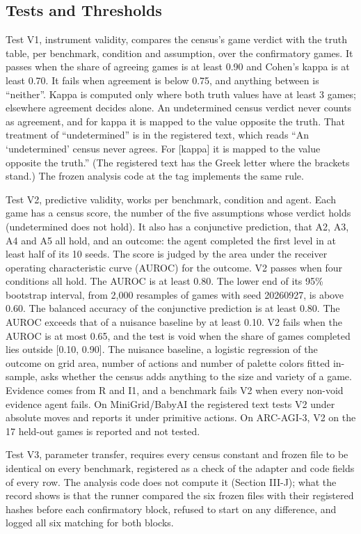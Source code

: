 \documentclass[journal]{IEEEtran}
\begin{document}
\subsection{Tests and Thresholds}\label{tests-and-thresholds}

Test V1, instrument validity, compares the census's game verdict with
the truth table, per benchmark, condition and assumption, over the
confirmatory games. It passes when the share of agreeing games is at
least 0.90 and Cohen's kappa is at least 0.70. It fails when agreement
is below 0.75, and anything between is ``neither''. Kappa is computed
only where both truth values have at least 3 games; elsewhere agreement
decides alone. An undetermined census verdict never counts as agreement,
and for kappa it is mapped to the value opposite the truth. That
treatment of ``undetermined'' is in the registered text, which reads
``An `undetermined' census never agrees. For {[}kappa{]} it is mapped to
the value opposite the truth.'' (The registered text has the Greek
letter where the brackets stand.) The frozen analysis code at the tag
implements the same rule.

Test V2, predictive validity, works per benchmark, condition and agent.
Each game has a census score, the number of the five assumptions whose
verdict holds (undetermined does not hold). It also has a conjunctive
prediction, that A2, A3, A4 and A5 all hold, and an outcome: the agent
completed the first level in at least half of its 10 seeds. The score is
judged by the area under the receiver operating characteristic curve
(AUROC) for the outcome. V2 passes when four conditions all hold. The
AUROC is at least 0.80. The lower end of its 95\% bootstrap interval,
from 2,000 resamples of games with seed 20260927, is above 0.60. The
balanced accuracy of the conjunctive prediction is at least 0.80. The
AUROC exceeds that of a nuisance baseline by at least 0.10. V2 fails
when the AUROC is at most 0.65, and the test is void when the share of
games completed lies outside {[}0.10, 0.90{]}. The nuisance baseline, a
logistic regression of the outcome on grid area, number of actions and
number of palette colors fitted in-sample, asks whether the census adds
anything to the size and variety of a game. Evidence comes from R and
I1, and a benchmark fails V2 when every non-void evidence agent fails.
On MiniGrid/BabyAI the registered text tests V2 under absolute moves and
reports it under primitive actions. On ARC-AGI-3, V2 on the 17 held-out
games is reported and not tested.

Test V3, parameter transfer, requires every census constant and frozen
file to be identical on every benchmark, registered as a check of the
adapter and code fields of every row. The analysis code does not compute
it (Section III-J); what the record shows is that the runner compared
the six frozen files with their registered hashes before each
confirmatory block, refused to start on any difference, and logged all
six matching for both blocks.
\end{document}
